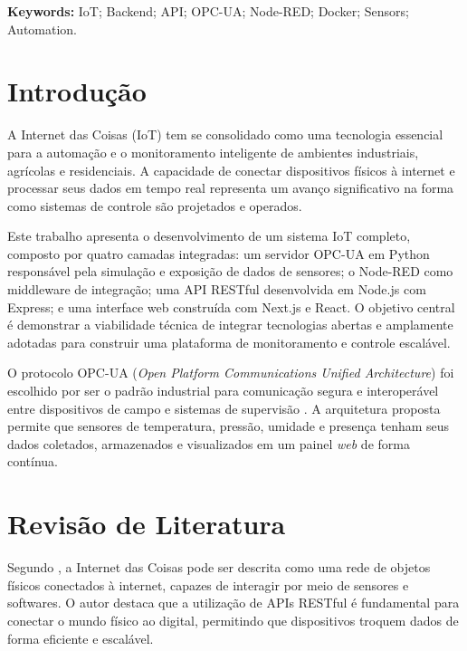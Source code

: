 \documentclass[12pt]{unisenaiclass}
\begin{document}
\begin{justify}
\textbf{Keywords:} IoT; Backend; API; OPC-UA; Node-RED; Docker; Sensors; Automation.
\end{justify}

\section{Introdução}

A Internet das Coisas (IoT) tem se consolidado como uma tecnologia essencial para a
automação e o monitoramento inteligente de ambientes industriais, agrícolas e residenciais.
A capacidade de conectar dispositivos físicos à internet e processar seus dados em tempo
real representa um avanço significativo na forma como sistemas de controle são projetados
e operados.

Este trabalho apresenta o desenvolvimento de um sistema IoT completo, composto por quatro
camadas integradas: um servidor OPC-UA em Python responsável pela simulação e exposição
de dados de sensores; o Node-RED como middleware de integração; uma API RESTful desenvolvida
em Node.js com Express; e uma interface web construída com Next.js e React. O objetivo
central é demonstrar a viabilidade técnica de integrar tecnologias abertas e amplamente
adotadas para construir uma plataforma de monitoramento e controle escalável.

O protocolo OPC-UA (\textit{Open Platform Communications Unified Architecture}) foi
escolhido por ser o padrão industrial para comunicação segura e interoperável entre
dispositivos de campo e sistemas de supervisão \cite{aguiar2023}. A arquitetura proposta
permite que sensores de temperatura, pressão, umidade e presença tenham seus dados
coletados, armazenados e visualizados em um painel \textit{web} de forma contínua.

\section{Revisão de Literatura}

Segundo \textcite{aguiar2023}, a Internet das Coisas pode ser descrita como uma rede de
objetos físicos conectados à internet, capazes de interagir por meio de sensores e
softwares. O autor destaca que a utilização de APIs RESTful é fundamental para conectar o
mundo físico ao digital, permitindo que dispositivos troquem dados de forma eficiente e
escalável.
\end{document}
